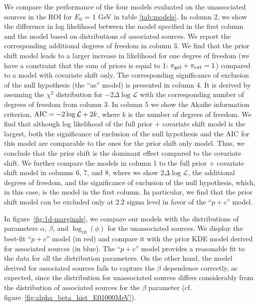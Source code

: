 We compare the performance of the four models evaluated on the unassociated sources in the ROI for $E_0$ = 1 GeV in table \ref{tab:models}.
In column 2, we show the difference in log likelihood between the model specified in the first column and the model based on distributions of associated sources.
We report the corresponding additional degrees of freedom in column 3.
We find that the prior shift model leads to a larger increase in likelihood for one degree of freedom (we have a constraint that the sum of priors is equal to 1: $\pi_{\rm gal} + \pi_{\rm ext} =1$) compared to a model with covariate shift only.
The corresponding significance of exclusion of the null hypothesis (the ``as'' model) is presented in column 4.
It is derived by assuming the $\chi^2$ distribution for $-2\Delta \log \mathcal{L}$ with the corresponding number of degrees of freedom from column 3.
In column 5 we show the Akaike information criterion, ${\rm AIC} = -2\log\mathcal{L} + 2 k$, where $k$ is the number of degrees of freedom.
We find that although log likelihood of the full prior $+$ covariate shift model is the largest,
both the significance of exclusion of the null hypothesis and the AIC for this model are comparable to the ones for the prior shift only model.
Thus, we conclude that the prior shift is the dominant effect compared to the covariate shift.
We further compare the models in column 1 to the full prior $+$ covariate shift model in columns 6, 7, and 8, where we show $2\Delta \log \mathcal{L}$, the additional degrees of freedom, and the significance of exclusion of the null hypothesis, which, in this case, is the model in the first column.
In particular, we find that the prior shift model can be excluded only at 2.2 sigma level in favor of the ``$p + c$'' model.


In figure~\ref{fig:1d-marginals},
we compare our models with the distributions of parameters $\alpha$, $\beta$, and $\log_{10}(\phi)$ for the unassociated sources. 
We display the best-fit ``$p+c$'' model (in red) and compare it with the prior KDE model derived for associated sources (in blue).
The ``$p+c$'' model provides a reasonable fit to the data for all the distribution parameters. On the other hand, the model derived for associated sources fails to capture the $\beta$ dependence correctly, as expected, since the distribution for unassociated sources differs considerably from the distribution of associated sources for the $\beta$ parameter (cf. figure~\ref{fig:alpha_beta_hist_E01000MeV}). 


